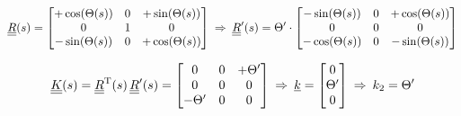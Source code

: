 \begin{frame}
  \vspace{-2em}
  \begin{displaymath}
    \underline{\underline{R}}(s) =
    \begin{bmatrix}
      +\cos(\Theta(s)) & 0 & +\sin(\Theta(s))\\
      0 & 1 & 0 \\
      -\sin(\Theta(s)) & 0 & +\cos(\Theta(s))
    \end{bmatrix}
    \: \Rightarrow \:
    \underline{\underline{R}}^{\prime}(s) =
    \Theta^{\prime} \cdot
    \begin{bmatrix}
      -\sin(\Theta(s)) & 0 & +\cos(\Theta(s))\\
      0 & 0 & 0 \\
      -\cos(\Theta(s)) & 0 & -\sin(\Theta(s))
    \end{bmatrix}
  \end{displaymath}
  
  \begin{displaymath}
    \underline{\underline{K}}(s) =
    \underline{\underline{R}}^{\mathrm{T}}(s) \, \underline{\underline{R}}^{\prime}(s) =
    \begin{bmatrix}
      0 & 0 & +\Theta^{\prime} \\
      0 & 0 & 0 \\
      -\Theta^{\prime} & 0 & 0
    \end{bmatrix}
    \: \Rightarrow \:
    \underline{k} =
    \begin{bmatrix}
      0 \\ \Theta^{\prime} \\ 0
    \end{bmatrix}
    \: \Rightarrow \:
    k_2 = \Theta^{\prime}
  \end{displaymath}
\end{frame}

